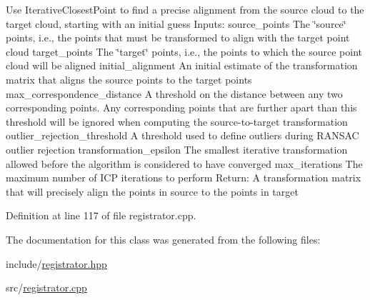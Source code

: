Use Iterative\+Closest\+Point to find a precise alignment from the source cloud to the target cloud, starting with an initial guess Inputs\+: source\+\_\+points The \char`\"{}source\char`\"{} points, i.\+e., the points that must be transformed to align with the target point cloud target\+\_\+points The \char`\"{}target\char`\"{} points, i.\+e., the points to which the source point cloud will be aligned initial\+\_\+alignment An initial estimate of the transformation matrix that aligns the source points to the target points max\+\_\+correspondence\+\_\+distance A threshold on the distance between any two corresponding points. Any corresponding points that are further apart than this threshold will be ignored when computing the source-\/to-\/target transformation outlier\+\_\+rejection\+\_\+threshold A threshold used to define outliers during R\+A\+N\+S\+AC outlier rejection transformation\+\_\+epsilon The smallest iterative transformation allowed before the algorithm is considered to have converged max\+\_\+iterations The maximum number of I\+CP iterations to perform Return\+: A transformation matrix that will precisely align the points in source to the points in target 

Definition at line 117 of file registrator.\+cpp.



The documentation for this class was generated from the following files\+:\begin{DoxyCompactItemize}
\item 
include/\hyperlink{registrator_8hpp}{registrator.\+hpp}\item 
src/\hyperlink{registrator_8cpp}{registrator.\+cpp}\end{DoxyCompactItemize}
